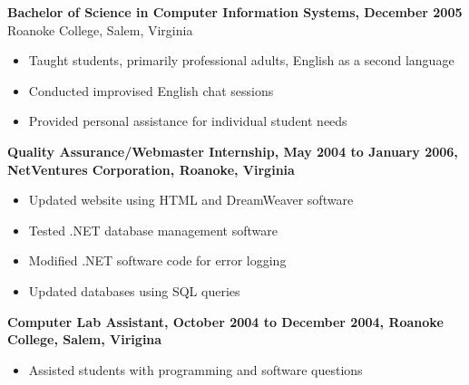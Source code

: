 \documentclass[10pt]{res}
\begin{document}
\begin{resume}
\begin{flushleft}
{\bf Bachelor of Science in Computer Information Systems, December 2005}\\
Roanoke College, Salem, Virginia
\end{flushleft}


\begin{itemize}
\setlength{\itemsep}{1pt}
\setlength{\parskip}{0pt}
\setlength{\parsep}{0pt}
\item Taught students, primarily professional adults, English as a second language
\item Conducted improvised English chat sessions
\item Provided personal assistance for individual student needs
\end{itemize}

\begin{flushleft}
{\bf Quality Assurance/Webmaster Internship, May 2004 to January 2006, NetVentures Corporation, Roanoke, Virginia}
\end{flushleft}

\begin{itemize}
\setlength{\itemsep}{1pt}
\setlength{\parskip}{0pt}
\setlength{\parsep}{0pt}
\item Updated website using HTML and DreamWeaver software
\item Tested .NET database management software
\item Modified .NET software code for error logging
\item Updated databases using SQL queries
\end{itemize}

\begin{flushleft}
{\bf Computer Lab Assistant, October 2004 to December 2004, Roanoke College, Salem, Virigina}
\end{flushleft}

\begin{itemize}
\setlength{\itemsep}{1pt}
\setlength{\parskip}{0pt}
\setlength{\parsep}{0pt}
\item Assisted students with programming and software questions
\end{itemize}







\end{resume}
\end{document}

